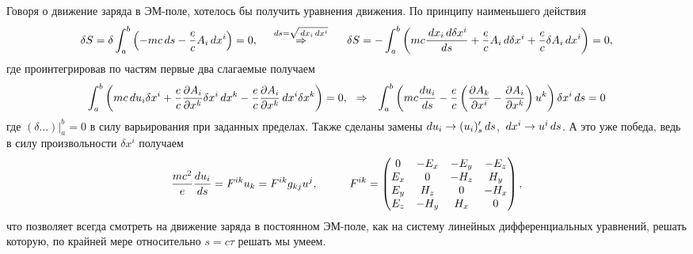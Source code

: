 Говоря о движение заряда в ЭМ-поле, хотелось бы получить уравнения движения. По принципу наименьшего действия
\begin{equation*}
    \delta S = \delta \int_a^b \left(
        -mc \, d s - \frac{e}{c} A_i \, d x^i
    \right) = 0,
    \hspace{0.5cm} \overset{ds = \sqrt{\, d x_i \, d x^i}}{\Rightarrow}  \hspace{0.5cm}
    \delta S = - \int_a^b \left(
        mc \frac{\, d x_i \, d \delta x^i}{d s} + \frac{e}{c} A_i \, d \delta x^i + \frac{e}{c} \delta A_i \, d x^i
    \right) = 0,
\end{equation*}
где проинтегрировав по частям первые два слагаемые получаем
\begin{equation*}
    \int_a^b
    \left(
        m c \, d u_i \delta x^i + \frac{e}{c} \frac{\partial A_i}{\partial x^k} \delta x^i \, d x^k - \frac{e}{c} \frac{\partial A_i}{\partial x^k} \, d x^i \delta x^k
    \right) = 0,
    \hspace{0.25cm} \Rightarrow \hspace{0.25cm}
    \int_a^b \left(
        mc \frac{d u_i}{d s} - \frac{e}{c} \left(
            \frac{\partial A_k}{\partial x^i} - \frac{\partial A_i}{\partial x^k} 
        \right) u^k
    \right) \delta x^i \, d s = 0
\end{equation*}
где $(\delta \ldots) |_a^b = 0$ в силу варьирования при заданных пределах. Также сделаны замены $d u_i \to (u_i)'_s \, d s$, $\, d x^i \to u^i \, d s$. А это уже победа, ведь в силу произвольности $\delta x^i$ получаем
\begin{equation}
     \frac{m c^2}{e} \frac{d u_i}{d s} = F^{ik} u_k = F^{ik} g_{kj} u^j,
     \hspace{10 mm}
     F^{ik} = \begin{pmatrix}
         0 & -E_x & -E_y  & -E_z \\
         E_x & 0 & -H_z  & H_y \\
         E_y & H_z & 0 & -H_x \\
         E_z & -H_y & H_x & 0 \\
     \end{pmatrix},
\label{EMtensor}
\end{equation}
что позволяет всегда смотреть на движение заряда в постоянном ЭМ-поле, как на систему линейных дифференциальных уравнений, решать которую, по крайней мере относительно $s = c \tau$ решать мы умеем.
